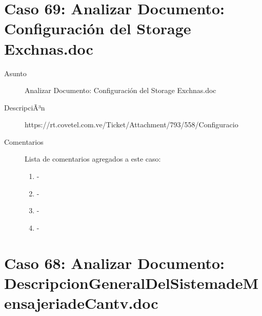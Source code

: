 \section{Caso 69: Analizar Documento: Configuración del Storage Exchnas.doc }

\begin{description}

\item[Asunto] Analizar Documento: Configuración del Storage Exchnas.doc\item[DescripciÃ³n] https://rt.covetel.com.ve/Ticket/Attachment/793/558/Configuracio%

\item[Comentarios] Lista de comentarios agregados a este caso:  
\begin{enumerate}
        \item {\bfseries  } - {\bfseries } \\         \item {\bfseries  } - {\bfseries } \\         \item {\bfseries  } - {\bfseries } \\         \item {\bfseries  } - {\bfseries } \\     \end{enumerate}

\end{description}

\section{Caso 68: Analizar Documento: DescripcionGeneralDelSistemadeMensajeriadeCantv.doc }

